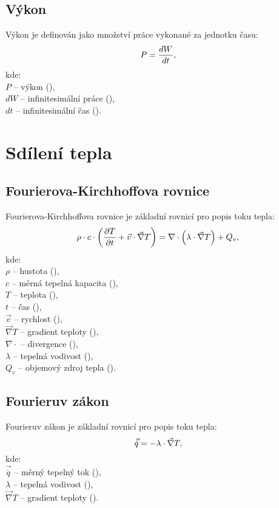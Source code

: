 \documentclass{article}
\begin{document}
\subsection{Výkon}
Výkon je definován jako množství práce vykonané za jednotku času:
\begin{equation}
    P = \frac{dW}{dt},
    \tagaddtext{(\ueqW)}
\end{equation}
kde:\\
$P$ -- výkon (\ueqW),\\
$dW$ -- infinitesimální práce (\ueqJ),\\
$dt$ -- infinitesimální čas (\ueqS).

\newpage



\section{Sdílení tepla}


\subsection{Fourierova-Kirchhoffova rovnice}
Fourierova-Kirchhoffova rovnice je základní rovnicí pro popis toku tepla:
\begin{equation}
    \rho \cdot c \cdot \left( \frac{\partial T}{\partial t} + \vec{v} \cdot \vec{\nabla} T \right) = \nabla \cdot \left( \lambda \cdot \vec{\nabla} T \right) + Q_v,
    \tagaddtext{(\ueqWandMinvcu)}
\end{equation}
kde:\\
$\rho$ -- hustota (\ueqKGandMinvcu),\\
$c$ -- měrná tepelná kapacita (\ueqJandKGinvKinv),\\
$T$ -- teplota (\ueqK),\\
$t$ -- čas (\ueqS),\\
$\vec{v}$ -- rychlost (\ueqMandSinv),\\
$\vec{\nabla} T$ -- gradient teploty (\ueqKandMinv),\\
$\nabla \cdot$ -- divergence (\ueqMinv),\\
$\lambda$ -- tepelná vodivost (\ueqWandMinvKinv),\\
$Q_v$ -- objemový zdroj tepla (\ueqWandMinvcu).


\subsection{Fourieruv zákon}
Fourieruv zákon je základní rovnicí pro popis toku tepla:
\begin{equation}
    \vec{\dot{q}} = - \lambda \cdot \vec{\nabla} T,
    \tagaddtext{(\ueqWandMinvsq)}
\end{equation}
kde:\\
$\vec{\dot{q}}$ -- měrný tepelný tok (\ueqWandMinvsq),\\
$\lambda$ -- tepelná vodivost (\ueqWandMinvKinv),\\
$\vec{\nabla} T$ -- gradient teploty (\ueqKandMinv).
\end{document}
